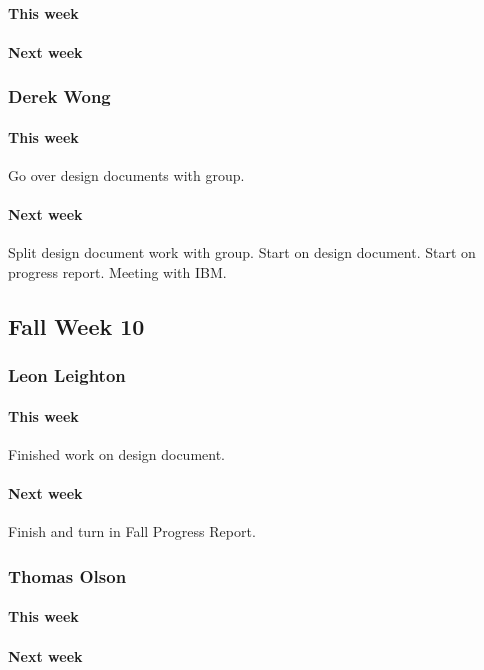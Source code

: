 \documentclass[10pt,letterpaper,onecolumn,draftclsnofoot]{IEEEtran}
\begin{document}
\paragraph{This week}
\paragraph{Next week}

\subsubsection{Derek Wong}
\paragraph{This week}Go over design documents with group.
\paragraph{Next week}Split design document work with group.                  
Start on design document.                
Start on progress report.             
Meeting with IBM.

\subsection{Fall Week 10}
\subsubsection{Leon Leighton}
\paragraph{This week}Finished work on design document.
\paragraph{Next week}Finish and turn in Fall Progress Report.

\subsubsection{Thomas Olson}
\paragraph{This week}
\paragraph{Next week}
\end{document}
